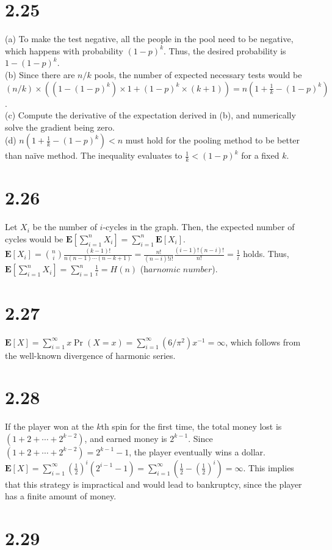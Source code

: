 \documentclass{article}
\begin{document}
\section*{2.25}
(a) To make the test negative, all the people in the pool need to be negative, which happens with probability $(1-p)^k$. Thus, the desired probability is $1-(1-p)^k$.\\
(b) Since there are $n/k$ pools, the number of expected necessary tests would be $(n/k)\times((1-(1-p)^k)\times1+(1-p)^k\times(k+1))=n(1+\frac{1}{k}-(1-p)^k)$.\\
(c) Compute the derivative of the expectation derived in (b), and numerically solve the gradient being zero.\\
(d) $n(1+\frac{1}{k}-(1-p)^k)<n$ must hold for the pooling method to be better than naïve method. The inequality evaluates to $\frac{1}{k}<(1-p)^k$ for a fixed $k$.
\section*{2.26}
Let $X_i$ be the number of $i$-cycles in the graph. Then, the expected number of cycles would be $\textbf{E}[\sum\limits_{i=1}^nX_i]=\sum\limits_{i=1}^n\textbf{E}[X_i]$.\\
$\textbf{E}[X_i]=\binom{n}{i}\frac{(k-1)!}{n(n-1)\cdots(n-k+1)}=\frac{n!}{(n-i)!i!}\frac{(i-1)!(n-i)!}{n!}=\frac{1}{i}$ holds.
Thus, $\textbf{E}[\sum\limits_{i=1}^nX_i]=\sum\limits_{i=1}^n\frac{1}{i}=H(n)$ ($\textit{harnomic number}$).
\section*{2.27}
$\textbf{E}[X]=\sum\limits_{i=1}^\infty x\Pr(X=x)=\sum\limits_{i=1}^\infty(6/\pi^2)x^{-1}=\infty$,
which follows from the well-known divergence of harmonic series.
\section*{2.28}
If the player won at the $k$th spin for the first time, the total money lost is $(1+2+\cdots+2^{k-2})$, and earned money is $2^{k-1}$.
Since $(1+2+\cdots+2^{k-2})=2^{k-1}-1$, the player eventually wins a dollar.\\
$\textbf{E}[X]=\sum\limits_{i=1}^\infty(\frac{1}{2})^i(2^{i-1}-1)=\sum\limits_{i=1}^\infty(\frac{1}{2}-(\frac{1}{2})^i)=\infty$.
This implies that this strategy is impractical and would lead to bankruptcy, since the player has a finite amount of money.
\section*{2.29}
\end{document}
